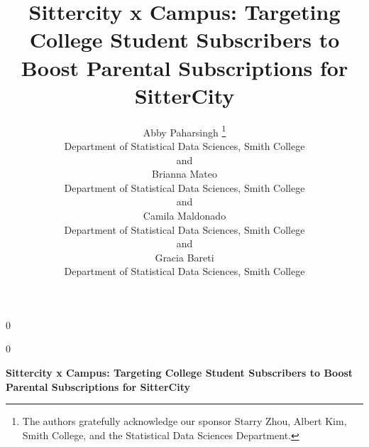 \documentclass[12pt]{article}
\newcommand{\blind}{0}
\begin{document}
\def\spacingset#1{\renewcommand{\baselinestretch}%
{#1}\small\normalsize} \spacingset{1}



\blind
{
  \title{\bf Sittercity x Campus: Targeting College Student Subscribers
to Boost Parental Subscriptions for SitterCity}

  \author{
        Abby Paharsingh \thanks{The authors gratefully acknowledge our
sponsor Starry Zhou, Albert Kim, Smith College, and the Statistical Data
Sciences Department.} \\
    Department of Statistical Data Sciences, Smith College\\
     and \\     Brianna Mateo \\
    Department of Statistical Data Sciences, Smith College\\
     and \\     Camila Maldonado \\
    Department of Statistical Data Sciences, Smith College\\
     and \\     Gracia Bareti \\
    Department of Statistical Data Sciences, Smith College\\
      }
  \maketitle
} \fi

\blind
{
  \bigskip
  \bigskip
  \bigskip
  \begin{center}
    {\LARGE\bf Sittercity x Campus: Targeting College Student
Subscribers to Boost Parental Subscriptions for SitterCity}
  \end{center}
  \medskip
} \fi
\end{document}
